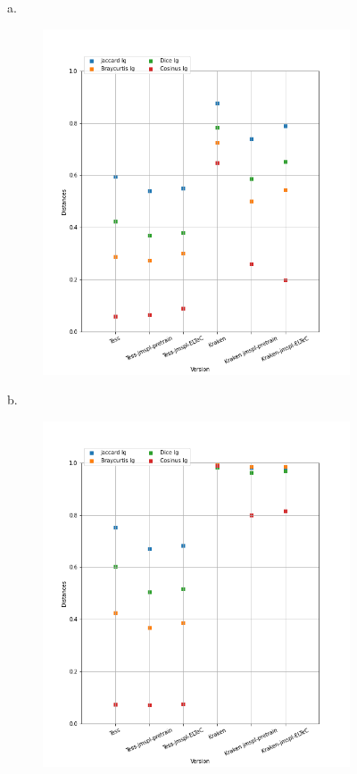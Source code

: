 \begin{figure}

\begin{minipage}{7cm}
a.\
\begin{subfigure}{0.99\textwidth}
 \includegraphics[height=.99\textwidth]{IMAGES/ELTeC_DISTANCES_spaCy3.5.1/TROLLOPE-graph-dist-spaCy3.5.1-lg.png}
  \label{fig:TROLLOPE-graph-dist-spaCy3.5.1-lg.png}
  \end{subfigure}
  \end{minipage}
\begin{minipage}{7cm}
b.\
  \begin{subfigure}{0.99\textwidth}
  \includegraphics[height=.99\textwidth]{IMAGES/ELTeC_DISTANCES_spaCy3.5.1/REYNOLDS-The-Mysteries-of-London-graph-dist-spaCy3.5.1-lg.png} 

\end{subfigure}
\end{minipage}
\end{figure}
